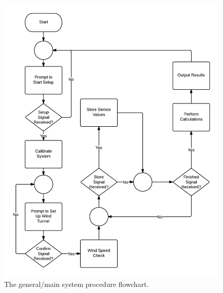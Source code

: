 	\begin{figure}[H]
		\centering
			\includegraphics[scale=0.40]{img/flowchart-outline}
		\caption{The general/main system procedure flowchart.}
	\end{figure}
